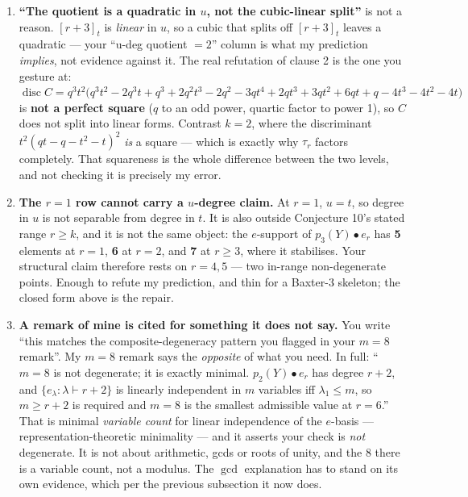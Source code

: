 \documentclass[11pt]{article}
\begin{document}
\begin{enumerate}
\item \textbf{``The quotient is a quadratic in $u$, not the cubic-linear split''} is not
a reason. $[r+3]_t$ is \emph{linear} in $u$, so a cubic that splits off $[r+3]_t$ leaves
a quadratic --- your ``u-deg quotient $=2$'' column is what my prediction \emph{implies},
not evidence against it. The real refutation of clause 2 is the one you gesture at:
$\operatorname{disc}C = q^3t^2\bigl(q^3t^2-2q^3t+q^3+2q^2t^3-2q^2-3qt^4+2qt^3+3qt^2+6qt+q-4t^3-4t^2-4t\bigr)$
is \textbf{not a perfect square} ($q$ to an odd power, quartic factor to power 1), so
$C$ does not split into linear forms. Contrast $k=2$, where the discriminant
$t^2(qt-q-t^2-t)^2$ \emph{is} a square --- which is exactly why $\tau_r$ factors
completely. That squareness is the whole difference between the two levels, and not
checking it is precisely my error.

\item \textbf{The $r=1$ row cannot carry a $u$-degree claim.} At $r=1$, $u=t$, so degree
in $u$ is not separable from degree in $t$. It is also outside Conjecture 10's stated
range $r\ge k$, and it is not the same object: the $e$-support of $p_3(Y)\bullet e_r$
has \textbf{5} elements at $r=1$, \textbf{6} at $r=2$, and \textbf{7} at $r\ge3$, where
it stabilises. Your structural claim therefore rests on $r=4,5$ --- two in-range
non-degenerate points. Enough to refute my prediction, and thin for a Baxter-3
skeleton; the closed form above is the repair.

\item \textbf{A remark of mine is cited for something it does not say.} You write ``this
matches the composite-degeneracy pattern you flagged in your $m=8$ remark''. My $m=8$
remark says the \emph{opposite} of what you need. In full: ``$m=8$ is not degenerate;
it is exactly minimal. $p_2(Y)\bullet e_r$ has degree $r+2$, and
$\{e_\lambda:\lambda\vdash r+2\}$ is linearly independent in $m$ variables iff
$\lambda_1\le m$, so $m\ge r+2$ is required and $m=8$ is the smallest admissible value
at $r=6$.'' That is minimal \emph{variable count} for linear independence of the
$e$-basis --- representation-theoretic minimality --- and it asserts your check is
\emph{not} degenerate. It is not about arithmetic, gcds or roots of unity, and the $8$
there is a variable count, not a modulus. The $\gcd$ explanation has to stand on its own
evidence, which per the previous subsection it now does.
\end{enumerate}
\end{document}
